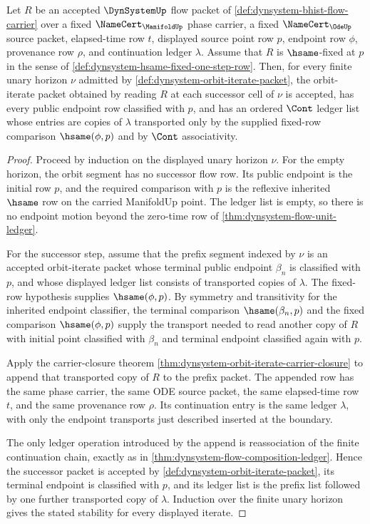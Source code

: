 \begin{theorem}
\label{thm:dynsystem-hsame-fixed-orbit-iterate-stability}
Let $R$ be an accepted $\DynSystemUp$ flow packet of \autoref{def:dynsystem-bhist-flow-carrier} over a fixed $\NameCert_{\ManifoldUp}$ phase carrier, a fixed $\NameCert_{\OdeUp}$ source packet, elapsed-time row $t$, displayed source point row $p$, endpoint row $\phi$, provenance row $\rho$, and continuation ledger $\lambda$. Assume that $R$ is $\hsame$-fixed at $p$ in the sense of \autoref{def:dynsystem-hsame-fixed-one-step-row}. Then, for every finite unary horizon $\nu$ admitted by \autoref{def:dynsystem-orbit-iterate-packet}, the orbit-iterate packet obtained by reading $R$ at each successor cell of $\nu$ is accepted, has every public endpoint row classified with $p$, and has an ordered $\Cont$ ledger list whose entries are copies of $\lambda$ transported only by the supplied fixed-row comparison $\hsame(\phi,p)$ and by $\Cont$ associativity.
\end{theorem}
\begin{proof}
Proceed by induction on the displayed unary horizon $\nu$. For the empty horizon, the orbit segment has no successor flow row. Its public endpoint is the initial row $p$, and the required comparison with $p$ is the reflexive inherited $\hsame$ row on the carried ManifoldUp point. The ledger list is empty, so there is no endpoint motion beyond the zero-time row of \autoref{thm:dynsystem-flow-unit-ledger}.

For the successor step, assume that the prefix segment indexed by $\nu$ is an accepted orbit-iterate packet whose terminal public endpoint $\beta_n$ is classified with $p$, and whose displayed ledger list consists of transported copies of $\lambda$. The fixed-row hypothesis supplies $\hsame(\phi,p)$. By symmetry and transitivity for the inherited endpoint classifier, the terminal comparison $\hsame(\beta_n,p)$ and the fixed comparison $\hsame(\phi,p)$ supply the transport needed to read another copy of $R$ with initial point classified with $\beta_n$ and terminal endpoint classified again with $p$.

Apply the carrier-closure theorem \autoref{thm:dynsystem-orbit-iterate-carrier-closure} to append that transported copy of $R$ to the prefix packet. The appended row has the same phase carrier, the same ODE source packet, the same elapsed-time row $t$, and the same provenance row $\rho$. Its continuation entry is the same ledger $\lambda$, with only the endpoint transports just described inserted at the boundary.

The only ledger operation introduced by the append is reassociation of the finite continuation chain, exactly as in \autoref{thm:dynsystem-flow-composition-ledger}. Hence the successor packet is accepted by \autoref{def:dynsystem-orbit-iterate-packet}, its terminal endpoint is classified with $p$, and its ledger list is the prefix list followed by one further transported copy of $\lambda$. Induction over the finite unary horizon gives the stated stability for every displayed iterate.
\end{proof}
